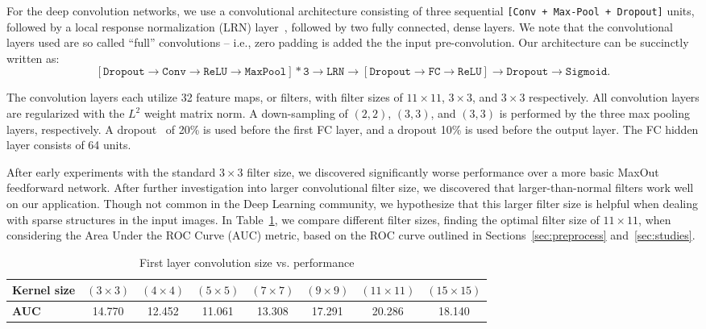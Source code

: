 For the deep convolution networks, we use a convolutional architecture consisting of three sequential \texttt{[Conv + Max-Pool + Dropout]} units, followed by a local response normalization (LRN) layer~\cite{dropout:and:LRN}, followed by two fully connected, dense layers. We note that the convolutional layers used are so called ``full'' convolutions -- i.e., zero padding is added the the input pre-convolution. Our architecture can be succinctly written as:
\begin{equation}
  \mathtt{[Dropout \rightarrow Conv \rightarrow ReLU \rightarrow MaxPool] * 3 \rightarrow LRN \rightarrow [Dropout \rightarrow FC \rightarrow ReLU]  \rightarrow Dropout \rightarrow Sigmoid}.
\end{equation}

The convolution layers each utilize 32 feature maps, or filters, with filter sizes of $11\times 11$, $3\times 3$, and $3\times 3$ respectively.  All convolution layers are regularized with the $L^{2}$ weight matrix norm.  A down-sampling of $(2, 2)$, $(3, 3)$, and $(3, 3)$ is performed by the three max pooling layers, respectively.  A dropout~\cite{dropout:and:LRN} of 20\% is used before the first FC layer, and a dropout 10\% is used before the output layer.  The FC hidden layer consists of 64 units.

After early experiments with the standard $3\times 3$ filter size, we discovered significantly worse performance over a more basic MaxOut \cite{maxout:goodfellow} feedforward network. After further investigation into larger convolutional filter size, we discovered that larger-than-normal filters work well on our application. Though not common in the Deep Learning community, we hypothesize that this larger filter size is helpful when dealing with sparse structures in the input images. In Table~\ref{tab:kernelsize}, we compare different filter sizes,  finding the optimal filter size of $11\times11$, when considering the Area Under the ROC Curve (AUC) metric, based on the ROC curve outlined in Sections~\ref{sec:preprocess} and~\ref{sec:studies}.

\begin{table}[h!]
  \centering
  \begin{tabular}{l|c|c|c|c|c|c|c}
    \bfseries Kernel size &  $(3 \times 3)$ & $(4 \times 4)$ & $(5 \times 5)$ & $(7 \times 7)$ & $(9 \times 9)$  & $(11 \times 11)$ & $(15 \times 15)$ \\ 
    \hline
    \bfseries AUC & 14.770 & 12.452 & 11.061 & 13.308 & 17.291 & 20.286 & 18.140 
  \end{tabular}
  \caption{First layer convolution size vs. performance}
  \label{tab:kernelsize}
\end{table}

